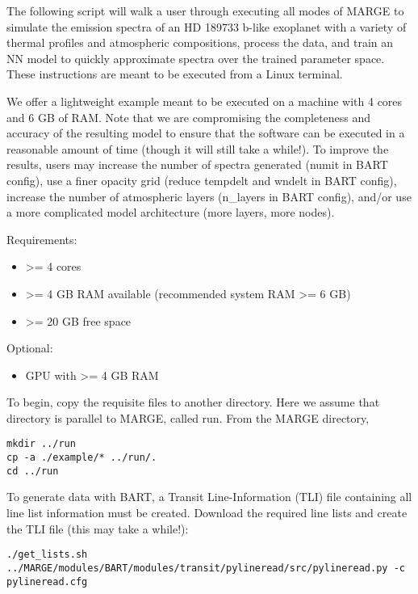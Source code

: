 \documentclass[letterpaper, 12pt]{article}
\begin{document}
\noindent The following script will walk a user through executing all modes of 
MARGE to simulate the emission spectra of an HD 189733 b-like exoplanet with a 
variety of thermal profiles and atmospheric compositions, process the data, and 
train an NN model to quickly approximate spectra over the trained parameter 
space.  These instructions are meant to be executed from a Linux terminal.  

We offer a lightweight example meant to be executed on a machine with 4 cores 
and 6 GB of RAM.  Note that we are compromising the completeness and accuracy 
of the resulting model to ensure that the software can be executed in a 
reasonable amount of time (though it will still take a while!).  To improve 
the results, users may increase the number of spectra generated (numit in BART 
config), use a finer opacity grid (reduce tempdelt and wndelt in BART config), 
increase the number of atmospheric layers (n\_layers in BART config), and/or 
use a more complicated model architecture (more layers, more nodes).

\noindent Requirements:
\begin{itemize}
\item \textgreater= 4 cores
\item \textgreater= 4 GB RAM available (recommended system RAM \textgreater= 6 GB)
\item \textgreater= 20 GB free space
\end{itemize}

\noindent Optional:
\begin{itemize}
\item GPU with \textgreater= 4 GB RAM
\end{itemize}

\noindent To begin, copy the requisite files to another directory.  Here we 
assume that directory is parallel to MARGE, called run.  From the MARGE 
directory,
\begin{verbatim}
mkdir ../run
cp -a ./example/* ../run/.
cd ../run
\end{verbatim}

\noindent To generate data with BART, a Transit Line-Information (TLI) file 
containing all line list information must be created.  Download the required 
line lists and create the TLI file (this may take a while!):
\begin{verbatim}
./get_lists.sh
../MARGE/modules/BART/modules/transit/pylineread/src/pylineread.py -c pylineread.cfg
\end{verbatim}
\end{document}
